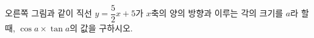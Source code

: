 \noindent\begin{minipage}[t]{0.58\linewidth}\vspace{0pt}\raggedright 오른쪽 그림과 같이 직선 $y=\dfrac{5}{2}x+5$가 $x$축의 양의 방향과 이루는 각의 크기를 $a$라 할 때, $\cos a\times\tan a$의 값을 구하시오.\end{minipage}\hfill\begin{minipage}[t]{0.4\linewidth}\vspace{0pt}\centering \resizebox{\ifdim\width>\linewidth\linewidth\else\width\fi}{!}{}\end{minipage}\par
